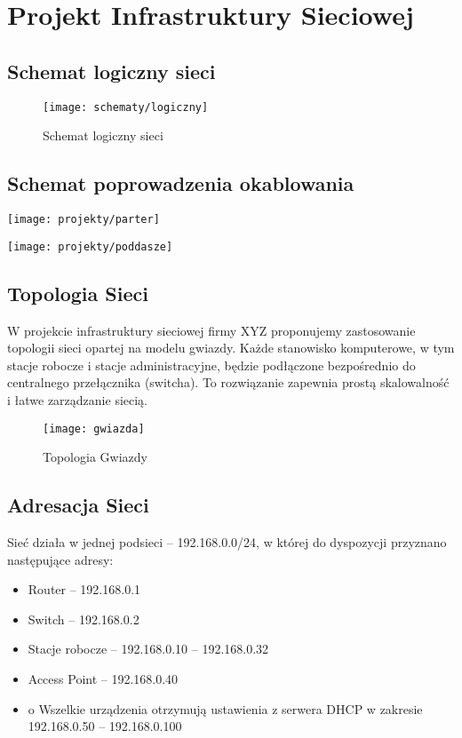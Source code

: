 \section{Projekt Infrastruktury Sieciowej}

\subsection{Schemat logiczny sieci}
        
    \begin{figure}[!htb]
        \centering
        \texttt{[image: schematy/logiczny]}
        \caption{Schemat logiczny sieci}
    \end{figure}

\subsection{Schemat poprowadzenia okablowania}




    \texttt{[image: projekty/parter]}


    \texttt{[image: projekty/poddasze]}


\pagebreak

\subsection{Topologia Sieci}

    W projekcie infrastruktury sieciowej firmy XYZ proponujemy zastosowanie topologii sieci opartej na modelu gwiazdy. Każde stanowisko komputerowe, w tym stacje robocze i stacje administracyjne, będzie podłączone bezpośrednio do centralnego przełącznika (switcha). To rozwiązanie zapewnia prostą skalowalność i łatwe zarządzanie siecią.

        
    \begin{figure}[!htb]
        \centering
        \texttt{[image: gwiazda]}
        \caption{Topologia Gwiazdy}
    \end{figure}

\subsection{Adresacja Sieci}

Sieć działa w jednej podsieci – 192.168.0.0/24, w której do dyspozycji przyznano następujące adresy:

\begin{itemize}
    \item Router – 192.168.0.1
    \item Switch – 192.168.0.2
    \item Stacje robocze – 192.168.0.10 – 192.168.0.32
    \item Access Point – 192.168.0.40
    \item o Wszelkie urządzenia otrzymują ustawienia z serwera DHCP w zakresie 192.168.0.50 –
    192.168.0.100
\end{itemize}



